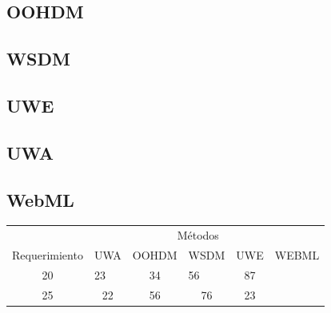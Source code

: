\documentclass{llncs}
\begin{document}
\subsection{OOHDM}
\subsection{WSDM}
\subsection{UWE}
\subsection{UWA}
\subsection{WebML}

 \begin{center}\begin{tabular}{cccccc}
  & &  \multicolumn{3}{c}{Métodos} \\ 
 Requerimiento & UWA &  OOHDM &  WSDM &  UWE & WEBML \\ 
 \hline 
 20 &  \multicolumn{1}{l}{23} &  34 &  \multicolumn{1}{l}{56} & 87 \\ 
 \cline{2-2} \cline{4-4} 
 25 &  22 &  56 &  76 & 23 \\ 
 \hline 
 \end{tabular}\end{center} 
 

\newpage
\end{document}

